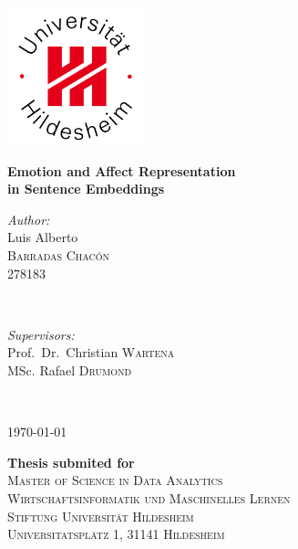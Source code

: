 \documentclass[a4paper,12pt]{report}
\begin{document}
\begin{titlepage}
\center

\vspace{-1cm}
\includegraphics[width=4cm]{img/logoUHi.jpg}
\vspace{2cm}

{ \Large \bfseries Emotion and Affect Representation}\\
\vspace{0.5cm}
{ \Large \bfseries in Sentence Embeddings}\\
\vspace{0.5cm}
\vspace{2cm}

\begin{minipage}{0.4\textwidth}
  \begin{flushleft} \large
  \emph{Author:}\\
  Luis Alberto \\
  \textsc{Barradas Chacón} \\
  278183 \\
  \end{flushleft}
\end{minipage}
~
\begin{minipage}{0.5\textwidth}
  \begin{flushright} \large
  \emph{Supervisors:} \\
  Prof.\ Dr.\ Christian \textsc{Wartena} \\
  MSc. Rafael \textsc{Drumond}
  \end{flushright}
\end{minipage}\\
\vspace{2cm}

{ \today}\\
\vspace{1cm}

{ \large \bfseries Thesis submited for}\\
\vspace{0.3cm}
\textsc{\Large Master of Science in Data Analytics}\\
\vspace{1cm}
\textsc{\large Wirtschaftsinformatik und Maschinelles Lernen}\\
\vspace{0.3cm}
\textsc{\large Stiftung Universität Hildesheim}\\
\vspace{0.3cm}
\textsc{\large Universitatsplätz 1, 31141 Hildesheim}\\
\vspace{0.3cm}

\vfill
\end{titlepage}
\end{document}
